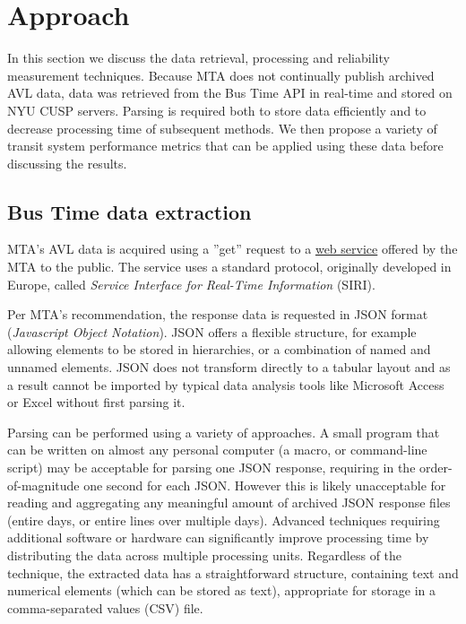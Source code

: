 \documentclass[12pt]{report}
\begin{document}
\newpage

\section{Approach}

In this section we discuss the data retrieval, processing and reliability measurement techniques.  Because MTA does not continually publish archived AVL data, data was retrieved from the Bus Time API in real-time and stored on NYU CUSP servers.  Parsing is required both to store data efficiently and to decrease processing time of subsequent methods.  We then propose a variety of transit system performance metrics that can be applied using these data before discussing the results.


\subsection{Bus Time data extraction}

MTA's AVL data is acquired using a ''get'' request to a \href{http://bustime.mta.info/}{web service} offered by the MTA to the public.  The service uses a standard protocol, originally developed in Europe, called \textit{Service Interface for Real-Time Information} (SIRI). 

Per MTA's recommendation, the response data is requested in JSON format (\textit{Javascript Object Notation}).  JSON offers a flexible structure, for example allowing elements to be stored in hierarchies, or a combination of named and unnamed elements.  JSON does not transform directly to a tabular layout and as a result cannot be imported by typical data analysis tools like Microsoft Access or Excel without first parsing it.

Parsing can be performed using a variety of approaches.  A small program that can be written on almost any personal computer (a macro, or command-line script) may be acceptable for parsing one JSON response, requiring in the order-of-magnitude one second for each JSON.  However this is likely unacceptable for reading and aggregating any meaningful amount of archived JSON response files (entire days, or entire lines over multiple days).  Advanced techniques requiring additional software or hardware can significantly improve processing time by distributing the data across multiple processing units.  Regardless of the technique, the extracted data has a straightforward structure, containing text and numerical elements (which can be stored as text), appropriate for storage in a comma-separated values (CSV) file.
\end{document}

